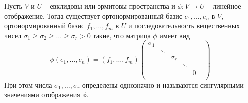 \begin{claim}
\label{claim::HermEuclHomClass}
Пусть $V$ и $U$ -- евклидовы или эрмитовы пространства и $\phi\colon V\to U$ -- линейное отображение.
Тогда
существует ортонормированный базис $e_1,\ldots,e_n$ в $V$, ортонормированный базис $f_1,\ldots,f_m$ в $U$ и последовательность вещественных чисел $\sigma_1\geqslant \sigma_2 \geqslant \ldots \geqslant \sigma_r > 0$ такие, что матрица $\phi$ имеет вид
\[
\phi(e_1,\ldots,e_n) = (f_1,\ldots,f_m) 
\begin{pmatrix}
{\sigma_1}&{}&{}&{}&{}&{}\\
{}&{\ddots}&{}&{}&{}&{}\\
{}&{}&{\sigma_r}&{}&{}&{}\\
{}&{}&{}&{\ddots}&{}&{}\\
{}&{}&{}&{}&{0}&{}\\
\end{pmatrix}
\]
При этом числа $\sigma_1,\ldots,\sigma_r$ определены однозначно и называются сингулярными значениями отображения $\phi$.
\end{claim}
